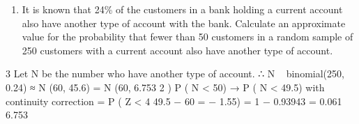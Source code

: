 \documentclass[a4paper,12pt]{article}
\begin{document}
\begin{enumerate}
\item It is known that 24\% of the customers in a bank holding a current account also have another type of account with the bank.
Calculate an approximate value for the probability that fewer than 50 customers in a random sample of 250 customers with a current account also have another type of
account.

\end{enumerate}
\newpage
3
Let N be the number who have another type of account.
∴ N ~ binomial(250, 0.24) ≈ N (60, 45.6) = N (60, 6.753 2 )
P ( N < 50) → P ( N < 49.5) with continuity correction
= P ( Z <
4
49.5 − 60
= − 1.55) = 1 − 0.93943 = 0.061
6.753
\end{document}
